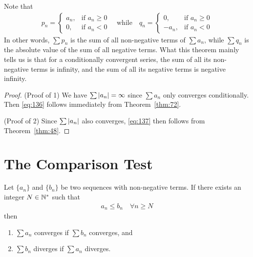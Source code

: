 \documentclass[thmcnt=section, 12pt]{my-elegantbook}
\begin{document}
\begin{note}
	Note that 
	\begin{align*}
		p_n = \begin{cases}
			a_n, 
			&\text{if $a_n \geq 0$} \\ 
			0,
			&\text{if $a_n < 0$}
		\end{cases}
		\quad \text{while} \quad
		q_n = \begin{cases}
			0, 
			&\text{if $a_n \geq 0$} \\ 
			-a_n,
			&\text{if $a_n < 0$}
		\end{cases}
	\end{align*}
	In other words, $\sum p_n$ is the sum of 
	all non-negative terms of $\sum a_n$,
	while $\sum q_n$ is the
	absolute value of the 
	sum of all negative terms.
	What this theorem mainly tells us 
	is that for a conditionally convergent series,
	the sum of all its non-negative terms is infinity,
	and the sum of all its negative terms is negative infinity.
\end{note}

\begin{proof}
	(Proof of 1) 
	We have $\sum \left\lvert a_n \right\rvert = \infty$ 
	since $\sum a_n$ only converges conditionally.
	Then \eqref{eq:136} follows immediately 
	from Theorem~\ref{thm:72}.

	(Proof of 2) 
	Since $\sum \left\lvert a_n \right\rvert$ also converges,
	\eqref{eq:137} then follows from Theorem~\ref{thm:48}.
\end{proof}


\section{The Comparison Test}


\begin{theorem} \label{thm:52}
    Let $\{a_n\}$ and $\{b_n\}$ be two sequences with non-negative terms. If there exists an integer $N \in \mathbb{N}^\ast$ such that 
    \begin{align*}
        a_n \leq b_n
        \quad \forall n \geq N
    \end{align*}
    then 
    \begin{enumerate}
        \item $\sum a_n$ converges if $\sum b_n$ converges, and 
        \item $\sum b_n$ diverges if $\sum a_n$ diverges.
    \end{enumerate}
\end{theorem}
\end{document}

